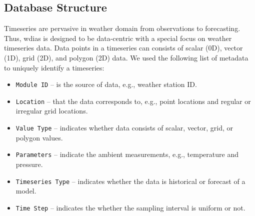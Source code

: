 \documentclass[conference]{IEEEtran}
\begin{document}
\subsection{Database Structure}
\label{psubse:wdias_database}

Timeseries are pervasive in weather domain from observations to forecasting. Thus, \acrshort{wdias} is designed to be data-centric with a special focus on weather timeseries data. Data points in a timeseries can consists of scalar (0D), vector (1D), grid (2D), and polygon (2D) data. We used the following list of metadata to uniquely identify a timeseries:

\begin{itemize}
    \item \texttt{Module ID} -- is the source of data, e.g., weather station ID.
    \item \texttt{Location} -- that the data corresponds to, e.g., point locations and regular or irregular grid locations.
    \item \texttt{Value Type} -- indicates whether data consists of scalar, vector, grid, or polygon values.
    \item \texttt{Parameters} -- indicate the ambient measurements, e.g., temperature and pressure.
    \item \texttt{Timeseries Type} -- indicates whether the data is historical or forecast of a model.
    \item \texttt{Time Step} -- indicates the whether the sampling interval is uniform or not.
\end{itemize}
\end{document}
